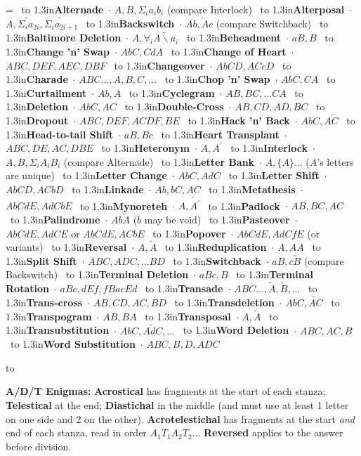 \def\x#1{\ \hbox to 1.3in{\hss \bf #1}\ $\cdot$}

\voffset -0.5in
\vsize 10in
\hoffset -0.5in
\hsize 7.5in
\parindent 0pt
\nopagenumbers
\frenchspacing

=\vbox{\obeylines\parskip=4pt\hsize
  \x{Alternade} $A, B, \Sigma_ia_ib_i$ (compare Interlock)
  \x{Alterposal} $A, \widetilde{\Sigma_ia_{2i}}, \widetilde{\Sigma_ia_{2i+1}}$
  \x{Backswitch} $Ab, \overleftarrow A c$ (compare Switchback)
  \x{Baltimore Deletion} $A, \forall_i\widetilde{A\backslash a_i}$
  \x{Beheadment} $aB, B$
  \x{Change 'n' Swap} $AbC, CdA$
  \x{Change of Heart} $ABC, DEF, AEC, DBF$
  \x{Changeover} $AbCD, ACeD$
  \x{Charade} $ABC..., A, B, C, ...$
  \x{Chop 'n' Swap} $AbC, CA$
  \x{Curtailment} $Ab, A$
  \x{Cyclegram} $AB, BC, ... CA$
  \x{Deletion} $AbC, AC$
  \x{Double-Cross} $AB, CD, AD, BC$
  \x{Dropout} $ABC, DEF, ACDF, BE$
  \x{Hack 'n' Back} $AbC, A\overleftarrow C$
  \x{Head-to-tail Shift} $aB, Bc$
  \x{Heart Transplant} $ABC, DE, AC, DBE$
  \x{Heteronym} $A, A^\prime$
  \x{Interlock} $A, B, \Sigma_iA_iB_i$ (compare Alternade)
  \x{Letter Bank} $A, \{A\}...$ ($A$'s letters are unique)
  \x{Letter Change} $AbC, AdC$
  \x{Letter Shift} $AbCD, ACbD$
  \x{Linkade} $Ab, bC, AC$
  \x{Metathesis} $AbCdE, AdCbE$
  \x{Mynoreteh} $A, \overleftarrow{A^\prime}$
  \x{Padlock} $AB, BC, AC$
  \x{Palindrome} $Ab\overleftarrow A$ ($b$ may be void)
  \x{Pasteover} $AbCdE, AdCE$ or $AbCdE, ACbE$
  \x{Popover} $AbCdE, AdCfE$ (or variants)
  \x{Reversal} $A, \overleftarrow A$
  \x{Reduplication} $A, AA$
  \x{Split Shift} $ABC, ADC, ... BD$
  \x{Switchback} $aB, c\overleftarrow B$ (compare Backswitch)
  \x{Terminal Deletion} $aBc, B$
  \x{Terminal Rotation} $aBc, dEf, fBa cEd$
  \x{Transade} $ABC..., \tilde A, \tilde B, ...$
  \x{Trans-cross} $AB, CD, AC, BD$
  \x{Transdeletion} $AbC, \widetilde{AC}$
  \x{Transpogram} $AB, BA$
  \x{Transposal} $A, \tilde A$
  \x{Transubstitution} $ AbC, \widetilde{AdC}, ...$
  \x{Word Deletion} $ABC, AC, B$
  \x{Word Substitution} $ABC, B, D, ADC$
}

\hbox to 
\parskip=4pt

{\bf A/D/T Enigmas:} {\bf Acrostical} has fragments at the start of each
stanza; {\bf Telestical} at the end; {\bf Diastichal} in the middle
(and must use at least 1 letter on one side and 2 on the other). {\bf
  Acrotelestichal} has fragments at the start {\it and} end of each
stanza, read in order $A_1T_1A_2T_2...$ {\bf Reversed} applies to the
answer before division.

